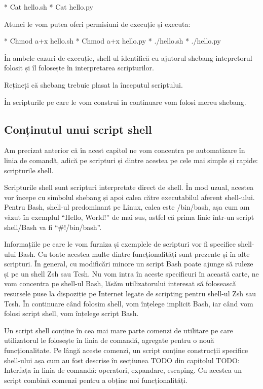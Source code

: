 * Cat hello.sh
* Cat hello.py

Atunci le vom putea oferi permisiuni de execuție și executa:

* Chmod a+x hello.sh
* Chmod a+x hello.py
* ./hello.sh
* ./hello.py

În ambele cazuri de execuție, shell-ul identifică cu ajutorul shebang
intepretorul folosit și îl folosește în interpretarea scripturilor.

Rețineți că shebang trebuie plasat la începutul scriptului.

În scripturile pe care le vom construi în continuare vom folosi mereu shebang.

\subsection{Conținutul unui script shell}
\label{sec:auto-dev-content}

Am precizat anterior că în acest capitol ne vom concentra pe automatizare în
linia de comandă, adică pe scripturi și dintre acestea pe cele mai simple și
rapide: scripturile shell.

Scripturile shell sunt scripturi interpretate direct de shell. În mod uzual,
acestea vor începe cu simbolul shebang și apoi calea către executabilul aferent
shell-ului. Pentru Bash, shell-ul predominant pe Linux, calea este /bin/bash,
așa cum am văzut în exemplul “Hello, World!” de mai sus, astfel că prima linie
într-un script shell/Bash va fi “\#!/bin/bash”.

Informațiile pe care le vom furniza și exemplele de scripturi vor fi specifice
shell-ului Bash. Cu toate acestea multe dintre funcționalități sunt prezente și
în alte scripturi. În general, cu modificări minore un script Bash poate ajunge
să ruleze și pe un shell Zsh sau Tcsh. Nu vom intra în aceste specificuri în
această carte, ne vom concentra pe shell-ul Bash, lăsăm utilizatorului interesat
să folosească resursele puse la dispoziție pe Internet legate de scripting
pentru shell-ul Zsh sau Tcsh. În continuare când folosim shell, vom înțelege
implicit Bash, iar când vom folosi script shell, vom înțelege script Bash.

Un script shell conține în cea mai mare parte comenzi de utilitare pe care
utilizatorul le folosește în linia de comandă, agregate pentru o nouă
funcționalitate. Pe lângă aceste comenzi, un script conține construcții
specifice shell-ului așa cum au fost descrise în secțiunea TODO din capitolul
TODO: Interfața în linia de comandă: operatori, expandare, escaping. Cu acestea
un script combină comenzi pentru a obține noi funcționalități.

